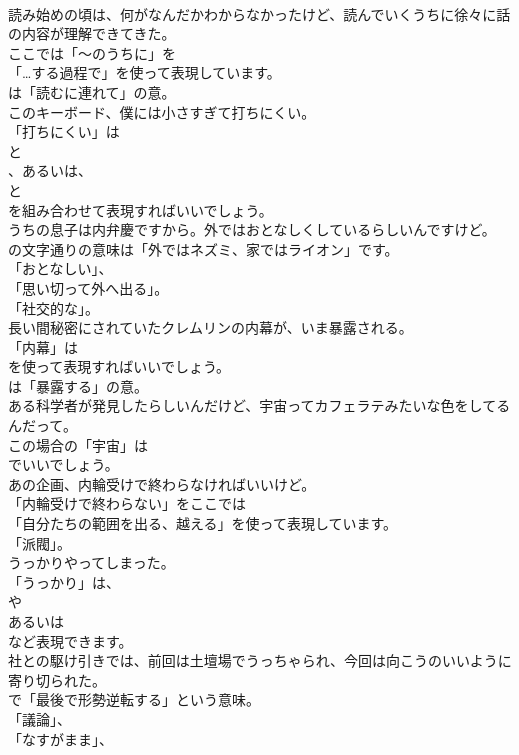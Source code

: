\documentclass[8pt]{extreport}
\begin{document}
\begin{CJK}{UTF8}{min}
\\	読み始めの頃は、何がなんだかわからなかったけど、読んでいくうちに徐々に話の内容が理解できてきた。 
\\	ここでは「～のうちに」を
\\	「…する過程で」を使って表現しています。
\\	は「読むに連れて」の意。	
\\	このキーボード、僕には小さすぎて打ちにくい。 
\\	「打ちにくい」は
\\	と
\\	、あるいは、
\\	と
\\	を組み合わせて表現すればいいでしょう。	
\\	うちの息子は内弁慶ですから。外ではおとなしくしているらしいんですけど。 
\\	の文字通りの意味は「外ではネズミ、家ではライオン」です。
\\	「おとなしい」、
\\	「思い切って外へ出る」。
\\	「社交的な」。	
\\	長い間秘密にされていたクレムリンの内幕が、いま暴露される。 
\\	「内幕」は 
\\	を使って表現すればいいでしょう。
\\	は「暴露する」の意。	
\\	ある科学者が発見したらしいんだけど、宇宙ってカフェラテみたいな色をしてるんだって。 
\\	この場合の「宇宙」は 
\\	でいいでしょう。	
\\	あの企画、内輪受けで終わらなければいいけど。 
\\	「内輪受けで終わらない」をここでは
\\	「自分たちの範囲を出る、越える」を使って表現しています。
\\	「派閥」。	
\\	うっかりやってしまった。 
\\	「うっかり」は、
\\	や
\\	あるいは
\\	など表現できます。	
\\	社との駆け引きでは、前回は土壇場でうっちゃられ、今回は向こうのいいように寄り切られた。 
\\	で「最後で形勢逆転する」という意味。
\\	「議論」、
\\	「なすがまま」、

\end{CJK}
\end{document}
